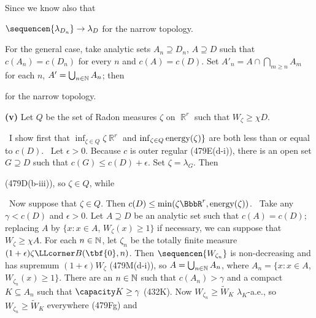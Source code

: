 {\noindent Since we know also that


\noindent $\sequencen{\lambda_{D_n}}\to\lambda_D$ for the narrow topology.

For the general case, take analytic sets $A_n\supseteq D_n$, $A\supseteq D$
such that $c(A_n)=c(D_n)$ for every $n$ and $c(A)=c(D)$.   Set
$A'_n=A\cap\bigcap_{m\ge n}A_m$ for each $n$, $A'=\bigcup_{n\in\Bbb N}A_n$;
then


\noindent for the narrow topology.

\medskip

{\bf (v)} Let $Q$ be the set of Radon measures $\zeta$ on $\BbbR^r$ such
that $W_{\zeta}\ge\chi D$.

\medskip

\qquad\grheada\ I show first that
$\inf_{\zeta\in Q}\zeta\BbbR^r$ and $\inf_{\zeta\in Q}\mathop{\text{energy}}\nolimits(\zeta)\}$
are both less than or equal to $c(D)$.
\Prf\ Let $\epsilon>0$.   Because $c$ is outer regular (479E(d-i)),
there is an open set $G\supseteq D$ such that $c(G)\le c(D)+\epsilon$.
Set $\zeta=\lambda_G$.   Then


\noindent (479D(b-iii)), so $\zeta\in Q$, while


\medskip

\qquad\grheadb\ Now suppose that $\zeta\in Q$.   Then
$c(D)\le\min(\zeta\BbbR^r,\energy(\zeta))$.   \Prf\
Take any $\gamma<c(D)$ and $\epsilon>0$.
Let $A\supseteq D$ be an analytic set such that
$c(A)=c(D)$;  replacing $A$ by $\{x:x\in A$, $W_{\zeta}(x)\ge 1\}$ if
necessary, we can suppose that $W_{\zeta}\ge\chi A$.
For each $n\in\Bbb N$, let $\zeta_n$ be the totally finite measure
$(1+\epsilon)\zeta\LLcorner B(\tbf{0},n)$.
Then $\sequencen{W_{\zeta_n}}$ is non-decreasing
and has supremum $(1+\epsilon)W_{\zeta}$ (479M(d-i)),
so $A=\bigcup_{n\in\Bbb N}A_n$,
where $A_n=\{x:x\in A$, $W_{\zeta_n}(x)\ge 1\}$.   There are an
$n\in\Bbb N$ such that $c(A_n)>\gamma$ and a compact
$K\subseteq A_n$ such that $\capacity K\ge\gamma$ (432K).   Now
$W_{\zeta_n}\ge\tilde W_K\,\,\lambda_K$-a.e., so
$W_{\zeta_n}\ge\tilde W_K$ everywhere (479Fg) and

}
